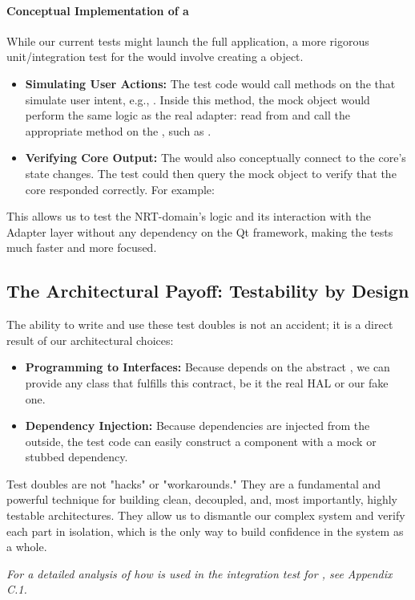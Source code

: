 \paragraph{Conceptual Implementation of a }
While our current tests might launch the full application, a more rigorous unit/integration test for the  would involve creating a  object.
\begin{itemize}
    \item \textbf{Simulating User Actions:} The test code would call methods on the  that simulate user intent, e.g., . Inside this method, the mock object would perform the same logic as the real adapter: read from  and call the appropriate method on the , such as .
    \item \textbf{Verifying Core Output:} The  would also conceptually connect to the core's state changes. The test could then query the mock object to verify that the core responded correctly. For example: 
\end{itemize}
This allows us to test the NRT-domain's logic and its interaction with the Adapter layer without any dependency on the Qt framework, making the tests much faster and more focused.

\subsection{The Architectural Payoff: Testability by Design}
\label{subsec:test_double_payoff}

The ability to write and use these test doubles is not an accident; it is a direct result of our architectural choices:
\begin{itemize}
    \item \textbf{Programming to Interfaces:} Because  depends on the abstract , we can provide any class that fulfills this contract, be it the real HAL or our fake one.
    \item \textbf{Dependency Injection:} Because dependencies are injected from the outside, the test code can easily construct a component with a mock or stubbed dependency.
\end{itemize}

Test doubles are not "hacks" or "workarounds." They are a fundamental and powerful technique for building clean, decoupled, and, most importantly, highly testable architectures. They allow us to dismantle our complex system and verify each part in isolation, which is the only way to build confidence in the system as a whole.

\textit{For a detailed analysis of how  is used in the integration test for , see Appendix C.1.}





